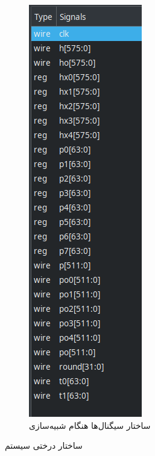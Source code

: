 \begin{figure}[H]
\begin{subfigure}{.5\textwidth}
\end{subfigure}%
\begin{subfigure}{.5\textwidth}
  \centering
  \includegraphics[width=0.5\linewidth]{figs/DescriptionOfSystem/wires_regs.png}
  \caption{ساختار سیگنال‌ها هنگام شبیه‌سازی}
  \label{wire_diagram}
\end{subfigure}
\caption{ساختار درختی سیستم}
\label{hierarchial_design}
\end{figure}

